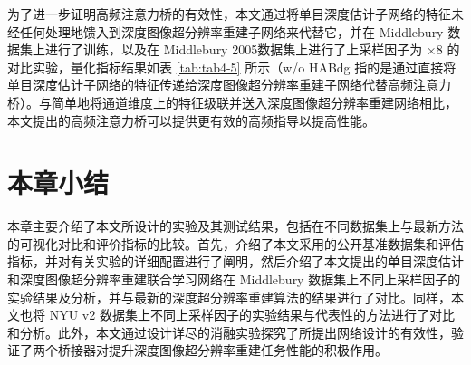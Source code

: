 为了进一步证明高频注意力桥的有效性，本文通过将单目深度估计子网络的特征未经任何处理地馈入到深度图像超分辨率重建子网络来代替它，并在 Middlebury 数据集上进行了训练，以及在 Middlebury 2005数据集上进行了上采样因子为 $\times 8$ 的对比实验，量化指标结果如表 \ref{tab:tab4-5} 所示（w/o HABdg 指的是通过直接将单目深度估计子网络的特征传递给深度图像超分辨率重建子网络代替高频注意力桥）。与简单地将通道维度上的特征级联并送入深度图像超分辨率重建网络相比，本文提出的高频注意力桥可以提供更有效的高频指导以提高性能。

\begin{table}[!htbp]
\caption{针对高频注意力桥的消融研究量化对比}
\label{tab:tab4-5}
\end{table}

\section{本章小结}

本章主要介绍了本文所设计的实验及其测试结果，包括在不同数据集上与最新方法的可视化对比和评价指标的比较。首先，介绍了本文采用的公开基准数据集和评估指标，并对有关实验的详细配置进行了阐明，然后介绍了本文提出的单目深度估计和深度图像超分辨率重建联合学习网络在 Middlebury 数据集上不同上采样因子的实验结果及分析，并与最新的深度超分辨率重建算法的结果进行了对比。同样，本文也将 NYU v2 数据集上不同上采样因子的实验结果与代表性的方法进行了对比和分析。此外，本文通过设计详尽的消融实验探究了所提出网络设计的有效性，验证了两个桥接器对提升深度图像超分辨率重建任务性能的积极作用。
